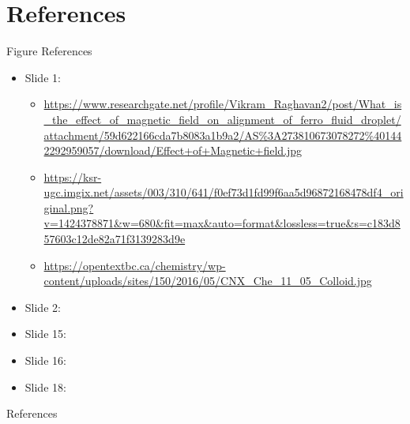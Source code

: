 \documentclass[9pt]{beamer}
\begin{document}
\section{References}
\begin{frame}{Figure References}
\begin{itemize}
	\item Slide 1:
	\begin{itemize}
		\item \url{https://www.researchgate.net/profile/Vikram\_Raghavan2/post/What\_is\_the\_effect\_of\_magnetic\_field\_on\_alignment\_of\_ferro\_fluid\_droplet/attachment/59d622166cda7b8083a1b9a2/AS\%3A273810673078272\%401442292959057/download/Effect+of+Magnetic+field.jpg}
		\item \url{https://ksr-ugc.imgix.net/assets/003/310/641/f0ef73d1fd99f6aa5d96872168478df4\_original.png?v=1424378871\&w=680\&fit=max\&auto=format\&lossless=true\&s=c183d857603c12de82a71f3139283d9e}
		\item \url{https://opentextbc.ca/chemistry/wp-content/uploads/sites/150/2016/05/CNX\_Che\_11\_05\_Colloid.jpg}
	\end{itemize}
	\item Slide 2: \cite{DrugTarget}
	\item Slide 15: \cite{DiffuseInterface}
	\item Slide 16: \cite{DiffuseInterface}
	\item Slide 18: \cite{DiffuseInterface}
\end{itemize}
\end{frame}

\tiny

\begin{frame}[allowframebreaks]{References}
	
	
\end{frame}
\end{document}
